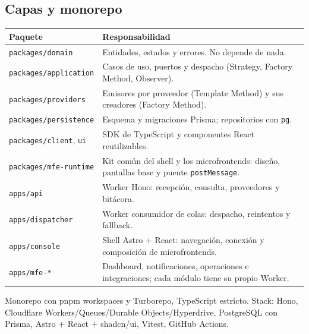 \documentclass[11pt,a4paper]{article}
\begin{document}
\subsection{Capas y monorepo}
\begin{tabularx}{\textwidth}{@{}lX@{}}
\toprule
\textbf{Paquete} & \textbf{Responsabilidad} \\
\midrule
\texttt{packages/domain} & Entidades, estados y errores. No depende de nada. \\
\texttt{packages/application} & Casos de uso, puertos y despacho (Strategy, Factory Method, Observer). \\
\texttt{packages/providers} & Emisores por proveedor (Template Method) y sus creadores (Factory Method). \\
\texttt{packages/persistence} & Esquema y migraciones Prisma; repositorios con \texttt{pg}. \\
\texttt{packages/client}, \texttt{ui} & SDK de TypeScript y componentes React reutilizables. \\
\texttt{packages/mfe-runtime} & Kit común del shell y los microfrontends: diseño, pantallas base y puente \texttt{postMessage}. \\
\texttt{apps/api} & Worker Hono: recepción, consulta, proveedores y bitácora. \\
\texttt{apps/dispatcher} & Worker consumidor de colas: despacho, reintentos y fallback. \\
\texttt{apps/console} & Shell Astro + React: navegación, conexión y composición de microfrontends. \\
\texttt{apps/mfe-*} & Dashboard, notificaciones, operaciones e integraciones; cada módulo tiene su propio Worker. \\
\bottomrule
\end{tabularx}

\medskip
Monorepo con pnpm workspaces y Turborepo, TypeScript estricto. Stack: Hono, Cloudflare Workers/Queues/Durable
Objects/Hyperdrive, PostgreSQL con Prisma, Astro + React + shadcn/ui, Vitest, GitHub Actions.
\end{document}
